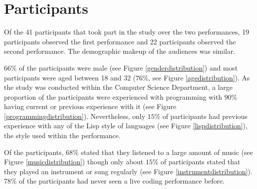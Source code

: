 

\section{Participants}

Of the 41 participants that took part in the study over the two performances, 19 participants observed the first performance and 22 participants observed the second performance. The demographic makeup of the audiences was similar.

$66\%$ of the participants were male (see Figure \ref{genderdistribution}) and most participants were aged between 18 and 32 ($76\%$, see Figure \ref{agedistribution}). As the study was conducted within the Computer Science Department, a large proportion of the participants were experienced with programming with $90\%$ having current or previous experience with it (see Figure \ref{programmingdistribution}). Nevertheless, only $15\%$ of participants had previous experience with any of the Lisp style of languages (see Figure \ref{lispdistribution}), the style used within the performance.

Of the participants, $68\%$ stated that they listened to a large amount of music (see Figure \ref{musicdistribution}) though only about $15\%$ of participants stated that they played an instrument or sung regularly (see Figure \ref{instrumentdistribution}). $78\%$ of the participants had never seen a live coding performance before.

